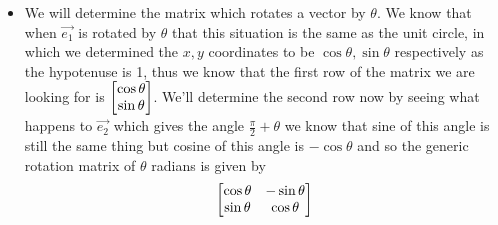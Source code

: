 \documentclass[11pt]{book}
\begin{document}
\begin{itemize}
\begin{itemize}
\begin{proof}
\begin{itemize}
\begin{itemize}
                                and thus the range of $T$ looks like $\left\{ \vec{x} \in W: \vec{x} = T\left(\vec{y}\right) \text{ for some  } y \in V  \right\} $ and thus the range is 
                                \[
                                \left\{ T\left(\alpha _{1} \vec{v_1} + \dotsb  + \alpha _{5} \vec{v_5} \right) \text{ for some  } \alpha_{1} ,\ldots,\alpha _{n} \in \mathbb{R}  \right\} 
                                \]
                                which will be 
                                \[
                                \mathit{span} {T\left(\vec{v_1} \right), \ldots, T\left(\vec{v}_{n}  \right)} 
                                \]
                                and so the dimension of the range is less than or equal to $n$ so there will be vectors in $W$ that are not reached as it's dimension is greater than $n$ and so the inverse of these vectors won't be defined, so the inverse must not exist which is a contradiction.
                        \end{itemize}
                    \item Case $n > k$.
                        \begin{itemize}
                            \item Making the same argument as above shows but looking at the range of $T^{-1} $ will give the same contradiction.
                        \end{itemize}
                \end{itemize}
            \end{proof}
        \end{itemize}
    \item We will determine the matrix which rotates a vector by $\theta $. We know that when $\vec{e_1} $ is rotated by $\theta $ that this situation is the same as the unit circle, in which we determined the $x,y$ coordinates to be $\cos{\theta}, \sin{\theta}  $ respectively as the hypotenuse is 1, thus we know that the first row of the matrix we are looking for is $\begin{bmatrix} \cos{\theta}  \\ \sin{\theta}     \end{bmatrix}$. We'll determine the second row now by seeing what happens to $\vec{e_2} $ which gives the angle $\frac{\pi }{2} + \theta $ we know that sine of this angle is still the same thing but cosine of this angle is $ - \cos{\theta} $ and so the generic rotation matrix of $\theta $ radians is given by
        \[
            \begin{bmatrix} \cos{\theta}  &  - \sin{\theta}  \\ \sin{\theta}  & \cos{\theta}  \end{bmatrix}
        \]

\end{itemize}
\end{document}
